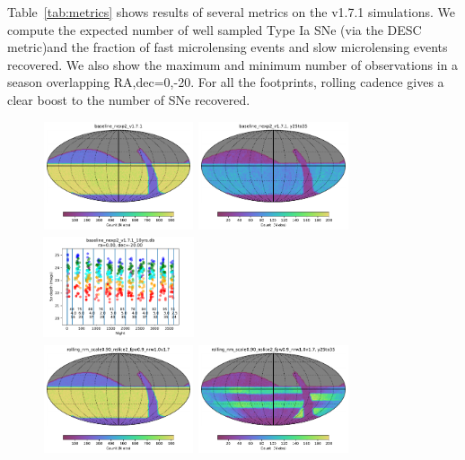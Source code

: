 \documentclass[modern]{aastex62}
\begin{document}
Table~\ref{tab:metrics} shows results of several metrics on the v1.7.1 simulations. We compute the expected number of well sampled Type Ia SNe (via the DESC metric)and the fraction of fast microlensing events and slow microlensing events recovered. We also show the maximum and minimum number of observations in a season overlapping RA,dec=0,-20. For all the footprints, rolling cadence gives a clear boost to the number of SNe recovered.  

\begin{figure}
\includegraphics[height=1.25in, width=1.75in]{plots/baseline_nexp2_v1.7.1/baseline_nexp2_v1_7_1_Count_HEAL_SkyMap.pdf}
\includegraphics[height=1.25in, width=1.75in]{plots/baseline_nexp2_v1.7.1/baseline_nexp2_v1_7_1_Count_night_gt_913_125000_and_night_lt_1278_375000_and_note_not_like_DD_HEAL_SkyMap.pdf}
\includegraphics[height=1.25in, width=1.75in]{plots/baseline_nexp2_v171_spotc.pdf}\\
\includegraphics[height=1.25in, width=1.75in]{plots/rolling_nm_scale0.90_nslice2_fpw0.9_nrw1.0v1.7/rolling_nm_scale0_90_nslice2_fpw0_9_nrw1_0v1_7_Count_HEAL_SkyMap.pdf}
\includegraphics[height=1.25in, width=1.75in]{plots/rolling_nm_scale0.90_nslice2_fpw0.9_nrw1.0v1.7/rolling_nm_scale0_90_nslice2_fpw0_9_nrw1_0v1_7_Count_night_gt_913_125000_and_night_lt_1278_375000_and_note_not_like_DD_HEAL_SkyMap.pdf}

\end{figure}
\end{document}
